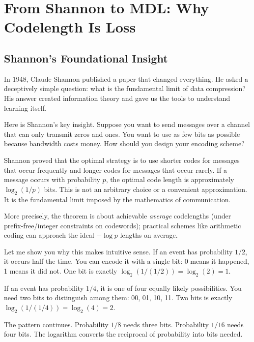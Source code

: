 \vspace{2em}

\section{From Shannon to MDL: Why Codelength Is Loss}

\subsection{Shannon's Foundational Insight}

In 1948, Claude Shannon published a paper that changed everything. He asked a deceptively simple question: what is the fundamental limit of data compression? His answer created information theory and gave us the tools to understand learning itself.

Here is Shannon's key insight. Suppose you want to send messages over a channel that can only transmit zeros and ones. You want to use as few bits as possible because bandwidth costs money. How should you design your encoding scheme?

Shannon proved that the optimal strategy is to use shorter codes for messages that occur frequently and longer codes for messages that occur rarely. If a message occurs with probability $p$, the optimal code length is approximately $\log_2(1/p)$ bits. This is not an arbitrary choice or a convenient approximation. It is the fundamental limit imposed by the mathematics of communication.

More precisely, the theorem is about achievable \emph{average} codelengths (under prefix-free/integer constraints on codewords); practical schemes like arithmetic coding can approach the ideal $-\log p$ lengths on average.

Let me show you why this makes intuitive sense. If an event has probability $1/2$, it occurs half the time. You can encode it with a single bit: 0 means it happened, 1 means it did not. One bit is exactly $\log_2(1/(1/2)) = \log_2(2) = 1$.

If an event has probability $1/4$, it is one of four equally likely possibilities. You need two bits to distinguish among them: 00, 01, 10, 11. Two bits is exactly $\log_2(1/(1/4)) = \log_2(4) = 2$.

The pattern continues. Probability $1/8$ needs three bits. Probability $1/16$ needs four bits. The logarithm converts the reciprocal of probability into bits needed.

